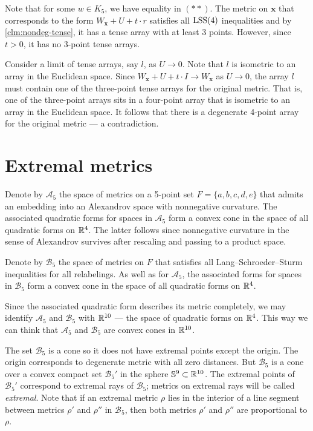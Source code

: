 \documentclass{article}
\begin{document}
Note that for some $w\in K_5$, we have equality in $({*}{*})$.
The metric on $\bm{x}$ that corresponds to the form $W_{\bm{x}}+U+t\cdot r$ satisfies all $\mathrm{LSS}(4)$ inequalities and
by \ref{clm:nondeg-tense}, it has a tense array with at least 3 points.
However, since $t>0$, it has no 3-point tense arrays.

Consider a limit of tense arrays, say $l$, as $U\to 0$. 
Note that $l$ is isometric to an array in the Euclidean space.
Since $W_{\bm{x}}+U+t\cdot I\to W_{\bm{x}}$ as $U\to 0$, the array $l$ must contain one of the three-point tense arrays for the original metric.
That is, one of the three-point arrays sits in a four-point array that is isometric to an array in the Euclidean space.
It follows that there is a degenerate 4-point array for the original metric
--- a contradiction.
\qeds

\section{Extremal metrics}\label{sec:ext}

Denote by $\mathcal{A}_5$ the space of metrics on a 5-point set $F=\{a,b,c,d,e\}$ that admits an embedding into an Alexandrov space with nonnegative curvature.
The associated quadratic forms for spaces in $\mathcal{A}_5$ form a convex cone in the space of all quadratic forms on $\mathbb{R}^4$.
The latter follows since nonnegative curvature in the sense of Alexandrov survives after rescaling and passing to a product space.

Denote by $\mathcal{B}_5$ the space of metrics on $F$ that satisfies all Lang--Schroeder--Sturm inequalities for all relabelings.
As well as for $\mathcal{A}_5$, the associated forms for spaces in $\mathcal{B}_5$ form a convex cone in the space of all quadratic forms on $\mathbb{R}^4$.

Since the associated quadratic form describes its metric completely, we may identify $\mathcal{A}_5$ and $\mathcal{B}_5$ with $\mathbb{R}^{10}$ --- the space of quadratic forms on $\mathbb{R}^4$.
This way we can think that $\mathcal{A}_5$ and $\mathcal{B}_5$ are convex cones in $\mathbb{R}^{10}$.

The set $\mathcal{B}_5$ is a cone so it does not have extremal points except the origin.
The origin corresponds to degenerate metric with all zero distances.
But $\mathcal{B}_5$ is a cone over a convex compact set $\mathcal{B}_5'$ in the sphere $\mathbb{S}^9\subset \mathbb{R}^{10}$.
The extremal points of $\mathcal{B}_5'$ correspond to extremal rays of $\mathcal{B}_5$;
metrics on extremal rays will be called \emph{extremal}.
Note that if an extremal metric $\rho$ lies in the interior of a line segment between metrics $\rho'$ and $\rho''$ in $\mathcal{B}_5$, then both metrics $\rho'$ and $\rho''$ are proportional to $\rho$.
\end{document}
